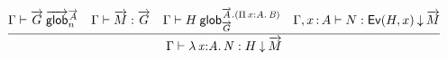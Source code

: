 \begin{small}\[
\infer
  {\ofdepglob{\Gamma}{\lam xAN}{H}{\tel M}}
  {\wfglob{\Gamma}{\tel G}{\tel A}n
  &\ofglob{\Gamma}{\tel M}{\tel G}
  &\wfdepglob{\Gamma}{H}{\tel A.(\picl xAB)}{\tel G}
  &\ofdepglob{\Gamma,\tptm xA}{N}{\Ev Hx}{\tel M}}
\]\end{small}



%
%
%
%

